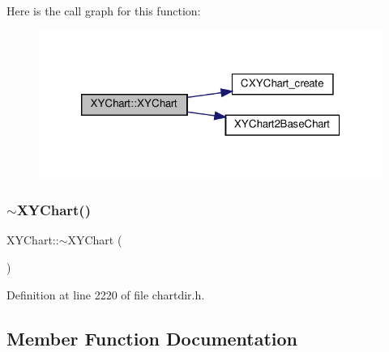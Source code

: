 Here is the call graph for this function\+:
\nopagebreak
\begin{figure}[H]
\begin{center}
\leavevmode
\includegraphics[width=320pt]{class_x_y_chart_af88de18a1c96e62c74532ca9386b5a11_cgraph}
\end{center}
\end{figure}
\mbox{\label{class_x_y_chart_ac0dbfde985dbdd51637c1bf22a2c0ce9}} 
\subsubsection{\texorpdfstring{$\sim$\+X\+Y\+Chart()}{~XYChart()}}
{\footnotesize\ttfamily X\+Y\+Chart\+::$\sim$\+X\+Y\+Chart (\begin{DoxyParamCaption}{ }\end{DoxyParamCaption})\hspace{0.3cm}{\ttfamily [inline]}}



Definition at line 2220 of file chartdir.\+h.



\subsection{Member Function Documentation}
\mbox{\label{class_x_y_chart_afc64c2af1d865e0197f1ec8ee808f33a}} 
